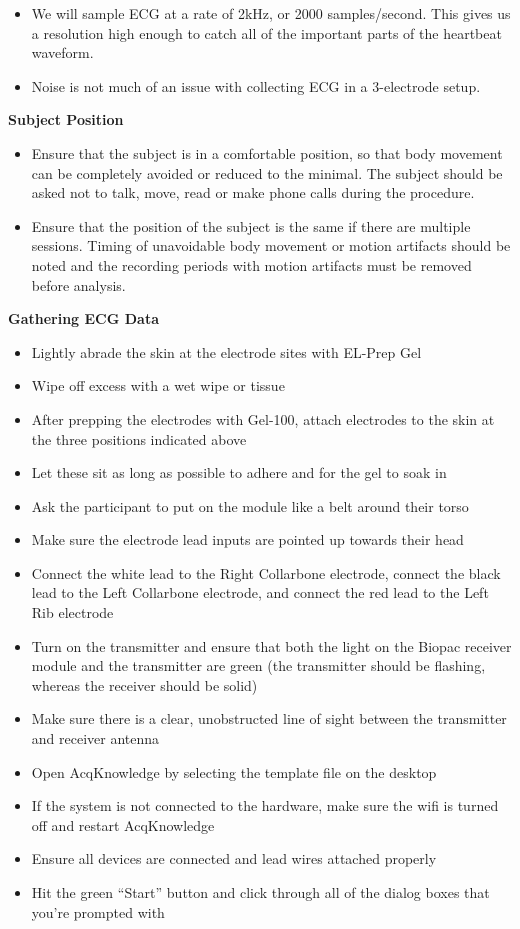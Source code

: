 \documentclass[]{book}
\providecommand{\tightlist}{%
  \setlength{\itemsep}{0pt}\setlength{\parskip}{0pt}}
\begin{document}
\begin{itemize}
\tightlist
\item
  We will sample ECG at a rate of 2kHz, or 2000 samples/second. This
  gives us a resolution high enough to catch all of the important parts
  of the heartbeat waveform.
\item
  Noise is not much of an issue with collecting ECG in a 3-electrode
  setup.
\end{itemize}

\textbf{Subject Position}

\begin{itemize}
\tightlist
\item
  Ensure that the subject is in a comfortable position, so that body
  movement can be completely avoided or reduced to the minimal. The
  subject should be asked not to talk, move, read or make phone calls
  during the procedure.
\item
  Ensure that the position of the subject is the same if there are
  multiple sessions. Timing of unavoidable body movement or motion
  artifacts should be noted and the recording periods with motion
  artifacts must be removed before analysis.
\end{itemize}

\textbf{Gathering ECG Data}

\begin{itemize}
\tightlist
\item
  Lightly abrade the skin at the electrode sites with EL-Prep Gel
\item
  Wipe off excess with a wet wipe or tissue
\item
  After prepping the electrodes with Gel-100, attach electrodes to the
  skin at the three positions indicated above
\item
  Let these sit as long as possible to adhere and for the gel to soak in
\item
  Ask the participant to put on the module like a belt around their
  torso
\item
  Make sure the electrode lead inputs are pointed up towards their head
\item
  Connect the white lead to the Right Collarbone electrode, connect the
  black lead to the Left Collarbone electrode, and connect the red lead
  to the Left Rib electrode
\item
  Turn on the transmitter and ensure that both the light on the Biopac
  receiver module and the transmitter are green (the transmitter should
  be flashing, whereas the receiver should be solid)
\item
  Make sure there is a clear, unobstructed line of sight between the
  transmitter and receiver antenna
\item
  Open AcqKnowledge by selecting the template file on the desktop
\item
  If the system is not connected to the hardware, make sure the wifi is
  turned off and restart AcqKnowledge
\item
  Ensure all devices are connected and lead wires attached properly
\item
  Hit the green ``Start'' button and click through all of the dialog
  boxes that you're prompted with
\end{itemize}
\end{document}
